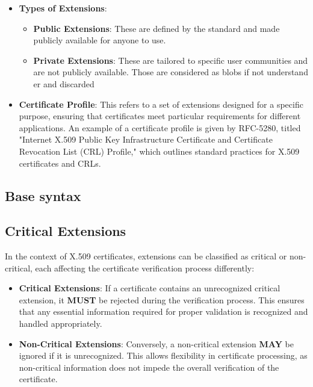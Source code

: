 \begin{itemize}
  \item \textbf{Types of Extensions}:
    \begin{itemize}
      \item \textbf{Public Extensions}: These are defined by the
        standard and made publicly available for anyone to use.
      \item \textbf{Private Extensions}: These are tailored to
        specific user communities and are not publicly available.
        Those are considered as blobs if not understand er and
        discarded
    \end{itemize}

  \item \textbf{Certificate Profile}: This refers to a set of
    extensions designed for a specific purpose, ensuring that
    certificates meet particular requirements for different
    applications. An example of a certificate profile is given by
    RFC-5280, titled "Internet X.509 Public Key Infrastructure
    Certificate and Certificate Revocation List (CRL) Profile,"
    which outlines standard practices for X.509 certificates and
    CRLs.
\end{itemize}

\subsection{Base syntax}

\subsection{Critical Extensions}

In the context of X.509 certificates, extensions can be classified as
critical or non-critical, each affecting the certificate verification
process differently:

\begin{itemize}
  \item \textbf{Critical Extensions}: If a certificate contains an
    unrecognized critical extension, it \textbf{MUST} be rejected
    during the verification process. This ensures that any essential
    information required for proper validation is recognized and
    handled appropriately.

  \item \textbf{Non-Critical Extensions}: Conversely, a non-critical
    extension \textbf{MAY} be ignored if it is unrecognized. This
    allows flexibility in certificate processing, as non-critical
    information does not impede the overall verification of the
    certificate.
\end{itemize}

